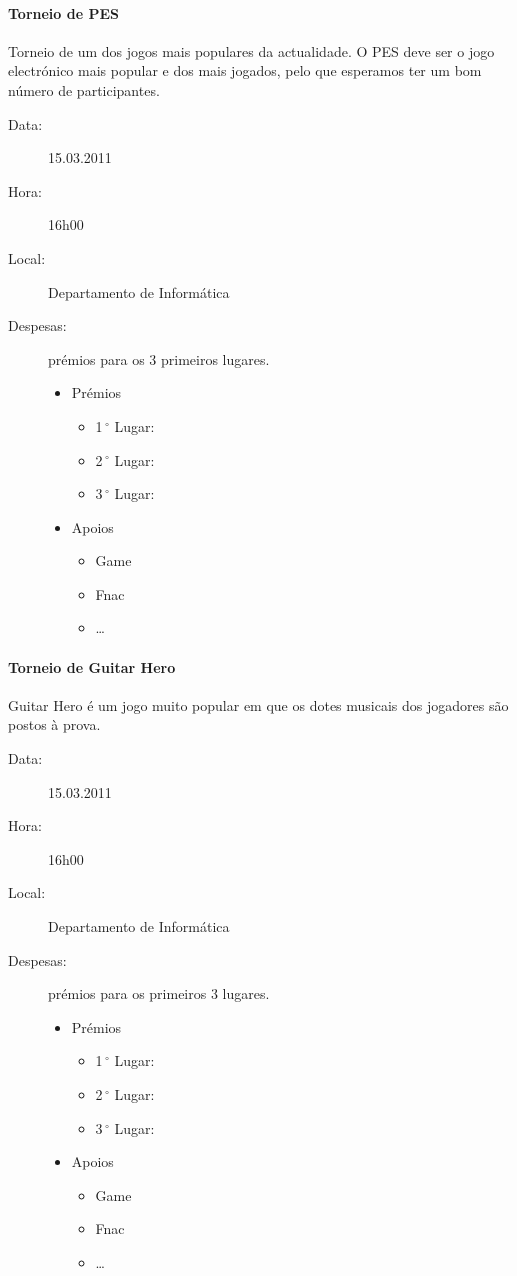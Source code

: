 \paragraph{Torneio de PES}
Torneio de um dos jogos mais populares da actualidade. O PES deve ser o jogo electrónico mais popular e dos mais jogados, pelo que esperamos ter um bom número de participantes.
\begin{description}
\item[Data:] 15.03.2011
\item[Hora:] 16h00
\item[Local:] Departamento de Informática
\item[Despesas:] prémios para os 3 primeiros lugares.
\begin{itemize}
\item Prémios
\begin{itemize}
\item 1$\,^{\circ}$ Lugar:
\item 2$\,^{\circ}$ Lugar:
\item 3$\,^{\circ}$ Lugar:
\end{itemize}
\item Apoios
\begin{itemize}
\item Game
\item Fnac
\item \dots  
\end{itemize}
\end{itemize}
\end{description}
%
\paragraph{Torneio de Guitar Hero}
Guitar Hero é um jogo muito popular em que os dotes musicais dos jogadores são postos à prova.
\begin{description}
\item[Data:] 15.03.2011
\item[Hora:] 16h00
\item[Local:] Departamento de Informática
\item[Despesas:] prémios para os primeiros 3 lugares.
\begin{itemize}
\item Prémios
\begin{itemize}
\item 1$\,^{\circ}$ Lugar:
\item 2$\,^{\circ}$ Lugar:
\item 3$\,^{\circ}$ Lugar:
\end{itemize}
\item Apoios
\begin{itemize}
\item Game
\item Fnac
\item \dots  
\end{itemize}
\end{itemize}
\end{description}
%
